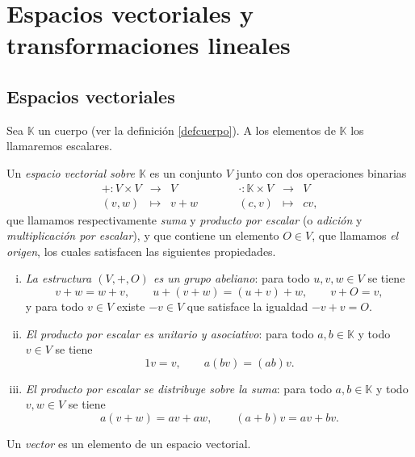 \chapter{Espacios vectoriales y transformaciones lineales}

\section{Espacios vectoriales}

Sea $\mathbb{K}$ un cuerpo (ver la definición \ref{defcuerpo}). A los elementos de $\mathbb{K}$ los llamaremos escalares.

\begin{defn}\label{defespvec}
Un \emph{espacio vectorial sobre $\mathbb{K}$} es un conjunto $V$ junto con dos operaciones binarias
\[
\begin{array}{rclcrcl}
+:V\times V & \longrightarrow & V &\qquad& \cdot: \mathbb{K}\times V & \longrightarrow & V \\
(v,w) & \longmapsto & v+w &\qquad& (c,v) & \longmapsto & cv, 
\end{array}
\]
que llamamos respectivamente \emph{suma} y \emph{producto por escalar} (o \emph{adici\'on} y \emph{multiplicaci\'on por escalar}), y que contiene un elemento $O\in V$, que llamamos \emph{el origen}, los cuales satisfacen las siguientes propiedades.
\begin{enumerate}[(i)]
\item \emph{La estructura $(V,+,O)$ es un grupo abeliano}: para todo $u,v,w\in V$ se tiene
\[ v+w=w+v,\qquad u+(v+w)=(u+v)+w,\qquad v+O=v,\]
y para todo $v\in V$ existe $-v\in V$ que satisface la igualdad $-v+v=O$.
\item \emph{El producto por escalar es unitario y asociativo}: para todo $a,b\in \mathbb{K}$ y todo $v\in V$ se tiene
\[ 1v=v,\qquad a(bv)=(ab)v.\]
\item \emph{El producto por escalar se distribuye sobre la suma}: para todo $a,b\in \mathbb{K}$ y todo $v,w\in V$ se tiene
\[ a(v+w)=av+aw,\qquad (a+b)v=av+bv.\] 
\end{enumerate}
Un \emph{vector} es un elemento de un espacio vectorial.
\end{defn}

